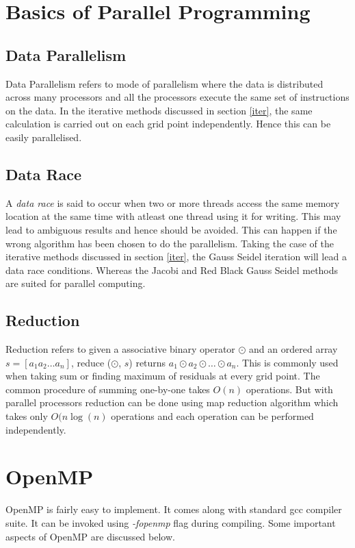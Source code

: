 \documentclass[a4paper]{report}
\begin{document}
	\section{Basics of Parallel Programming}
	\subsection{Data Parallelism}
	Data Parallelism refers to mode of parallelism where the data is distributed across many processors and all the processors execute the same set of instructions on the data. In the iterative methods discussed in section \ref{iter}, the same calculation is carried out on each grid point independently. Hence this can be easily parallelised.		
	
	\subsection{Data Race}	
	A \textit{data race} is said to occur when two or more threads access the same memory location at the same time with atleast one thread using it for writing. This may lead to ambiguous results and hence should be avoided. This can happen if the wrong algorithm has been chosen to do the parallelism. Taking the case of the iterative methods discussed in section \ref{iter}, the Gauss Seidel iteration will lead a data race conditions. Whereas the Jacobi and Red Black Gauss Seidel methods are suited for parallel computing.

	\subsection{Reduction}
	Reduction refers to given a associative binary operator $\odot$ and an ordered array $s=[a_1 a_2 \dots a_n]$, reduce ($\odot$, $s$) returns $a_1 \odot a_2 \odot \dots \odot a_n$. This is commonly used when taking sum or finding maximum of residuals at every grid point. The common procedure of summing one-by-one takes $O(n)$ operations. But with parallel processors reduction can be done using map reduction algorithm which takes only $O(n \log(n)$ operations and each operation can be performed independently.	
	
	\section{OpenMP}
	OpenMP is fairly easy to implement. It comes along with standard gcc compiler suite. It can be invoked using \textit{-fopenmp} flag during compiling. Some important aspects of OpenMP are discussed below.
	
\end{document}
